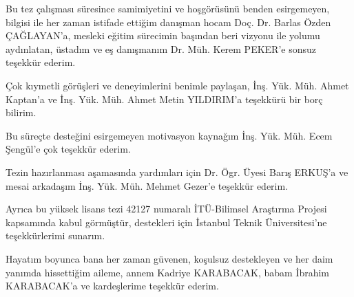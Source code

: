 	Bu tez çalışması süresince samimiyetini ve hoşgörüsünü benden esirgemeyen,
	bilgisi ile her zaman istifade ettiğim danışman hocam Doç. Dr. Barlas
	Özden ÇAĞLAYAN’a, mesleki eğitim sürecimin başından beri vizyonu ile
	yolumu aydınlatan, üstadım ve eş danışmanım Dr. Müh. Kerem PEKER’e
	sonsuz teşekkür ederim.
	
	Çok kıymetli görüşleri ve deneyimlerini benimle paylaşan, İnş. Yük.
	Müh. Ahmet Kaptan’a ve İnş. Yük. Müh. Ahmet Metin YILDIRIM’a teşekkürü
	bir borç bilirim.
	
	Bu süreçte desteğini esirgemeyen motivasyon kaynağım İnş. Yük. Müh.
	Ecem Şengül’e çok teşekkür ederim. 
	
	Tezin hazırlanması aşamasında yardımları için Dr. Ögr. Üyesi Barış
	ERKUŞ’a ve mesai arkadaşım İnş. Yük. Müh. Mehmet Gezer’e teşekkür
	ederim.
	
	Ayrıca bu yüksek lisans tezi 42127 numaralı İTÜ-Bilimsel Araştırma
	Projesi kapsamında kabul görmüştür, destekleri için İstanbul Teknik
	Üniversitesi’ne teşekkürlerimi sunarım.
	
	Hayatım boyunca bana her zaman güvenen, koşulsuz destekleyen ve her
	daim yanımda hissettiğim aileme, annem Kadriye KARABACAK, babam İbrahim
	KARABACAK’a ve kardeşlerime teşekkür ederim.